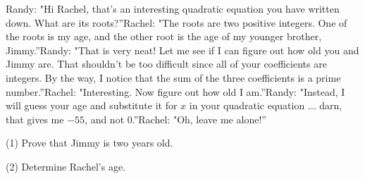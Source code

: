 Randy: "Hi Rachel, that's an interesting quadratic equation you have written down.  What are its roots?''Rachel: "The roots are two positive integers.  One of the roots is my age, and the other root is the age of my younger brother, Jimmy.''Randy: "That is very neat!  Let me see if I can figure out how old you and Jimmy are.  That shouldn't be too difficult since all of your coefficients are integers.  By the way, I notice that the sum of the three coefficients is a prime number.''Rachel: "Interesting.  Now figure out how old I am.''Randy: "Instead, I will guess your age and substitute it for $x$ in your quadratic equation $\dots$ darn, that gives me $-55$,  and not $0$.''Rachel: "Oh, leave me alone!''

(1) Prove that Jimmy is two years old.

(2) Determine Rachel's age.